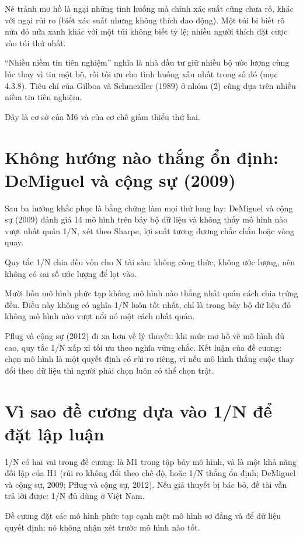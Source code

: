 Né tránh mơ hồ là ngại những tình huống mà chính xác suất cũng chưa rõ, khác với ngại rủi ro (biết xác suất nhưng không thích dao động). Một túi bi biết rõ nửa đỏ nửa xanh khác với một túi không biết tỷ lệ; nhiều người thích đặt cược vào túi thứ nhất.

“Nhiều niềm tin tiên nghiệm” nghĩa là nhà đầu tư giữ nhiều bộ ước lượng cùng lúc thay vì tin một bộ, rồi tối ưu cho tình huống xấu nhất trong số đó (mục 4.3.8). Tiêu chí của Gilboa và Schmeidler (1989) ở nhóm (2) cũng dựa trên nhiều niềm tin tiên nghiệm.

Đây là cơ sở của M6 và của cơ chế giảm thiểu thứ hai.

\section{Không hướng nào thắng ổn định: DeMiguel và cộng sự (2009)}

Sau ba hướng khắc phục là bằng chứng làm mọi thứ lung lay: DeMiguel và cộng sự (2009) đánh giá 14 mô hình trên bảy bộ dữ liệu và không thấy mô hình nào vượt nhất quán 1/N, xét theo Sharpe, lợi suất tương đương chắc chắn hoặc vòng quay.

Quy tắc 1/N chia đều vốn cho N tài sản: không công thức, không ước lượng, nên không có sai số ước lượng để lọt vào.

Mười bốn mô hình phức tạp không mô hình nào thắng nhất quán cách chia trứng đều. Điều này không có nghĩa 1/N luôn tốt nhất, chỉ là trong bảy bộ dữ liệu đó không mô hình nào vượt nổi nó một cách nhất quán.

Pflug và cộng sự (2012) đi xa hơn về lý thuyết: khi mức mơ hồ về mô hình đủ cao, quy tắc 1/N xấp xỉ tối ưu theo nghĩa vững chắc. Kết luận của đề cương: chọn mô hình là một quyết định có rủi ro riêng, vì nếu mô hình thắng cuộc thay đổi theo dữ liệu thì người phải chọn luôn có thể chọn trật.

\section{Vì sao đề cương dựa vào 1/N để đặt lập luận}

1/N có hai vai trong đề cương: là M1 trong tập bảy mô hình, và là một khả năng đối lập của H1 (rủi ro không đổi theo chế độ, hoặc 1/N thắng ổn định; DeMiguel và cộng sự, 2009; Pflug và cộng sự, 2012). Nếu giả thuyết bị bác bỏ, đề tài vẫn trả lời được: 1/N đủ dùng ở Việt Nam.

Đề cương đặt các mô hình phức tạp cạnh một mô hình sơ đẳng và để dữ liệu quyết định; nó không nhận xét trước mô hình nào tốt.

